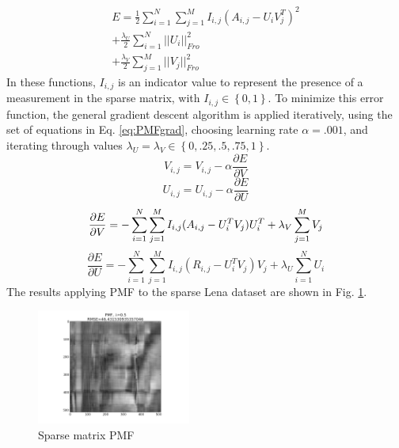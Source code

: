 \documentclass[journal]{IEEEtran}
\begin{document}
\begin{align}
    E=\frac{1}{2}\sum\limits_{i=1}^N\sum\limits_{j=1}^MI_{i,j}(A_{i,j}-U_iV_j^T)^2 \nonumber \\
    +\frac{\lambda_U}{2}\sum\limits_{i=1}^N||U_i||_{Fro}^2 \nonumber \\
    + \frac{\lambda_V}{2}\sum\limits_{j=1}^M||V_j||_{Fro}^2
\label{eq:PMFerr}
\end{align}
In these functions, \begin{math}I_{i,j}\end{math} is an indicator value to represent the presence of a measurement in the sparse matrix, with 
\begin{math}I_{i,j} \in \left\{0,1\right\} \end{math}.
To minimize this error function, the general gradient descent algorithm is applied iteratively, using the set of equations in Eq. \ref{eq:PMFgrad},
choosing learning rate \begin{math}\alpha = .001\end{math}, and iterating through values 
\begin{math}\lambda_U = \lambda_V \in \left\{0,.25,.5,.75,1\right\}
\end{math}.
\begin{equation}
    V_{i,j} = V_{i,j} - \alpha\frac{\partial E}{\partial V} \nonumber
\end{equation}
\begin{equation}
    U_{i,j} = U_{i,j} - \alpha\frac{\partial E}{\partial U} \nonumber
\end{equation}
\begin{equation}
    \frac{\partial E}{\partial V} = -\sum\limits_{i=1}^N\sum\limits_{j=1}^MI_{i,j}(A_{i,j}-U_i^TV_j)U_i^T + \lambda_V\sum\limits_{j=1}^MV_j \nonumber \\
\end{equation}
\begin{equation}
    \frac{\partial E}{\partial U} = -\sum\limits_{i=1}^N\sum\limits_{j=1}^MI_{i,j}(R_{i,j}-U_i^TV_j)V_j + \lambda_U\sum\limits_{i=1}^NU_i
    \label{eq:PMFgrad}
\end{equation}
The results applying PMF to the sparse Lena dataset are shown in Fig. \ref{fig:sparsepmf}.
\begin{figure}[h!]
\centering
    \includegraphics[width=0.45\textwidth]{sparsepmf.png}
    \caption{Sparse matrix PMF}
    \label{fig:sparsepmf}
\end{figure}
\end{document}
